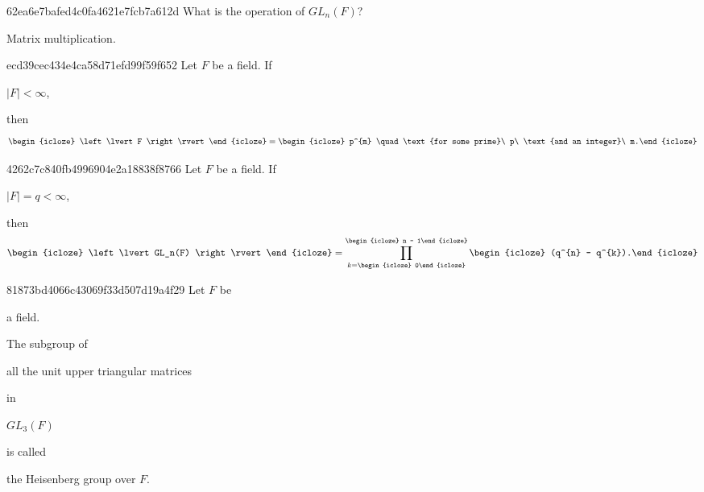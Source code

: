 \begin{note}{62ea6e7bafed4c0fa4621e7fcb7a612d}
    What is the operation of \({ GL_n(F) }\)?

    \begin{cloze}{1}
        Matrix multiplication.
    \end{cloze}
\end{note}

\begin{note}{ecd39cec434e4ca58d71efd99f59f652}
    Let \({ F }\) be a field.
    If \begin{icloze}{2}\({ \left\lvert F \right\rvert < \infty }\),\end{icloze} then
    \[
        \begin{icloze}{3}\left\lvert F \right\rvert\end{icloze} = \begin{icloze}{1}p^{m} \quad \text{for some prime}\ p\ \text{and an integer}\ m.\end{icloze}
    \]
\end{note}

\begin{note}{4262c7c840fb4996904e2a18838f8766}
    Let \({ F }\) be a field.
    If \begin{icloze}{4}\({ \left\lvert F \right\rvert = q < \infty }\),\end{icloze} then
    \[
        \begin{icloze}{3}\left\lvert GL_n(F) \right\rvert\end{icloze} = \prod_{k = \begin{icloze}{2}0\end{icloze}}^{\begin{icloze}{2}n - 1\end{icloze}} \begin{icloze}{1}(q^{n} - q^{k}).\end{icloze}
    \]
\end{note}

\begin{note}{81873bd4066c43069f33d507d19a4f29}
    Let \({ F }\) be \begin{icloze}{4}a field.\end{icloze} The subgroup of \begin{icloze}{1}all the unit upper triangular matrices\end{icloze} in \begin{icloze}{2}\({ GL_3(F) }\)\end{icloze} is called \begin{icloze}{3}the Heisenberg group over \({ F }\).\end{icloze}
\end{note}

